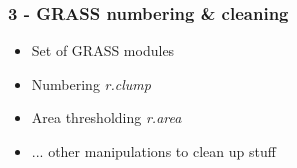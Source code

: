\documentclass[aspectratio=169]{beamer}
\begin{document}
{
\begin{frame}[plain]
\end{frame}}


\begin{frame}
  \frametitle{3 - GRASS numbering \& cleaning}
\begin{center}
\begin{itemize}
 \item Set of GRASS modules 
 \item Numbering \textit{r.clump}
 \item Area thresholding \textit{r.area}
 \item ... other manipulations to clean up stuff
\end{itemize}
\end{center}
\end{frame}

\end{document}

